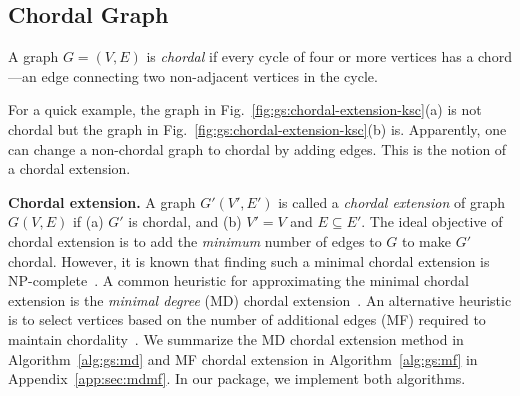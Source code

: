 




\subsection{Chordal Graph}
\label{sec:gs:chordal-graph}

\begin{definition}
    A graph $G = (V, E)$ is \emph{chordal} if every cycle of four or more vertices has a chord---an edge connecting two non-adjacent vertices in the cycle. 
    
\end{definition}

For a quick example, the graph in Fig.~\ref{fig:gs:chordal-extension-ksc}(a) is not chordal but the graph in Fig.~\ref{fig:gs:chordal-extension-ksc}(b) is. Apparently, one can change a non-chordal graph to chordal by adding edges. This is the notion of a chordal extension.

\textbf{Chordal extension.} A graph $G'(V', E')$ is called a \emph{chordal extension} of graph $G(V, E)$ if (a) $G'$ is chordal, and (b) $V' = V$ and $E\subseteq E'$. The ideal objective of chordal extension is to add the \emph{minimum} number of edges to $G$ to make $G'$ chordal. However, it is known that finding such a minimal chordal extension is NP-complete~\cite{Yannakakis1981siam-minimum-fill-in}.
A common heuristic for approximating the minimal chordal extension is the \emph{minimal degree} (MD) chordal extension~\cite{Rose1976siam-vertex-elimination}. An alternative heuristic is to select vertices based on the number of additional edges (MF) required to maintain chordality~\cite{Yannakakis1981siam-minimum-fill-in}. We summarize the MD chordal extension method in Algorithm~\ref{alg:gs:md} and MF chordal extension in Algorithm~\ref{alg:gs:mf} in Appendix~\ref{app:sec:mdmf}. 
 In our \spot package, we implement both algorithms.

